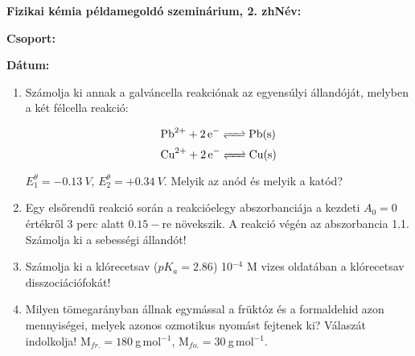 \documentclass[a4paper, 11pt]{article}
\begin{document}
\textbf{Fizikai kémia példamegoldó szeminárium, 2. zh}\hfill \textbf{Név:}

\hfill \textbf{Csoport:}

\hfill \textbf{Dátum:}

\thispagestyle{empty}

\begin{enumerate}

\item Számolja ki annak a galváncella reakciónak az egyensúlyi állandóját, melyben a két félcella reakció:
 
\begin{equation}
        \ce{Pb^{2+} + 2e^- <=> Pb(s)}
\end{equation}
\begin{equation}
        \ce{Cu^{2+} + 2e^- <=> Cu(s)}
\end{equation}

$E_1^\theta=-0.13~V$, $E_2^\theta=+0.34~V$. Melyik az anód és melyik a katód? 

\item Egy elsőrendű reakció során a reakcióelegy abszorbanciája a kezdeti $A_0=0$ értékről 3 perc alatt $0.15-$re növekszik. A reakció végén az abszorbancia 1.1. Számolja ki a sebességi állandót!

\item Számolja ki a klórecetsav ($pK_a=2.86$) 10$^{-4}$ M vizes oldatában a klórecetsav disszociációfokát!  

\item Milyen tömegarányban állnak egymással a früktóz és a formaldehid azon mennyiségei, melyek azonos ozmotikus nyomást fejtenek ki? Válaszát indolkolja! M$_{fr.}=180~$g$\,$mol$^{-1}$, M$_{fo.}=30~$g$\,$mol$^{-1}$.

\end{enumerate}
\end{document}
